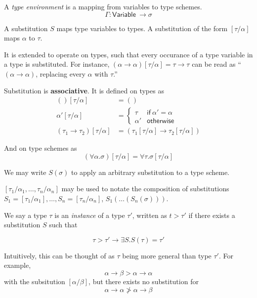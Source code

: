 A \textit{type environment} is a mapping from variables to type schemes. 
$$\Gamma : \mathsf{Variable} \ \rightarrow \sigma$$

A substitution $S$ maps type variables to types. A substitution of the
form $[\tau/\alpha]$ maps $\alpha$ to $\tau$.

It is extended to operate on types, such that every occurance of a
type variable in a type is substituted.
For instance, $(\alpha \rightarrow \alpha)[\tau/\alpha] = \tau \rightarrow \tau$ can be read as ``$(\alpha \rightarrow \alpha)$,
replacing every $\alpha$ with $\tau$.''

  Substitution is \textbf{associative}. It is defined on types as
  \begin{align*}
    () [\tau/\alpha] &= () \\
    \alpha' [\tau/\alpha] &=
                            \begin{cases}
                              \tau & \mathsf{if} \ \alpha' = \alpha \\
                              \alpha' & \mathsf{otherwise}
                            \end{cases} \\
    (\tau_1 \rightarrow \tau_2)[\tau/\alpha] &= (\tau_1[\tau/\alpha] \rightarrow \tau_2[\tau/\alpha])
  \end{align*}

And on type schemes as
$$(\forall \alpha . \sigma)[\tau/\alpha] = \forall \tau . \sigma[\tau/\alpha]$$

We may write $S(\sigma)$ to apply an arbitrary substitution to a type
scheme.

$[\tau_1/\alpha_1, \ldots, \tau_n/\alpha_n]$ may be used to notate the composition of
substitutions $S_1 = [\tau_1/\alpha_1], \ldots, S_n = [\tau_n/\alpha_n]$, $S_1(\ldots(S_n(\sigma)))$.

We say a type $\tau$ is an \textit{instance} of a type $\tau'$,
written as $t > \tau'$ if there exists a substitution $S$ such that

$$ \tau > \tau' \rightarrow \exists S. S(\tau) = \tau' $$

Intuitively, this can be thought of as $\tau$ being more general than
type $\tau'$. For example,
$$ \alpha \rightarrow \beta > \alpha \rightarrow \alpha $$
with the subsitution $[\alpha/\beta]$, but there exists no substitution for
$$ \alpha \rightarrow \alpha \ngtr \alpha \rightarrow \beta$$

